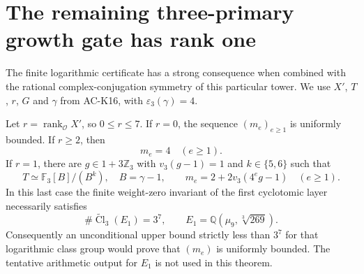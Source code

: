 \section{The remaining three-primary growth gate has rank one}
\label{sec:cubic-rank-gate}

The finite logarithmic certificate has a strong consequence when
combined with the rational complex-conjugation symmetry of this
particular tower.  We use $X'$, $T$, $r$, $G$ and $\gamma$ from
AC-K16, with $\varepsilon_3(\gamma)=4$.

\begin{theorem}
\label{AC-K17}
Let $r=\operatorname{rank}_{\mathcal O}X'$, so $0\leq r\leq7$.
If $r=0$, the sequence $(m_e)_{e\geq1}$ is uniformly bounded.
If $r\geq2$, then
\[
                         m_e=4\quad(e\geq1).           \tag{KR.1}
\]
If $r=1$, there are $g\in1+3\mathbb Z_3$ with
$v_3(g-1)=1$ and $k\in\{5,6\}$ such that
\[
 T\simeq\mathbb F_3[B]/(B^k),\quad B=\gamma-1,
 \qquad
 m_e=2+2v_3(4^eg-1)\quad(e\geq1).                     \tag{KR.2}
\]
In this last case the finite weight-zero invariant of the
first cyclotomic layer necessarily satisfies
\[
 \#\widetilde{\operatorname{Cl}}_3(E_1)=3^7,\qquad
 E_1=\mathbb Q(\mu_9,\sqrt[3]{269}).                    \tag{KR.3}
\]
Consequently an unconditional upper bound strictly less than
$3^7$ for that logarithmic class group would prove that
$(m_e)$ is uniformly bounded.  The tentative arithmetic output
for $E_1$ is not used in this theorem.
\end{theorem}

